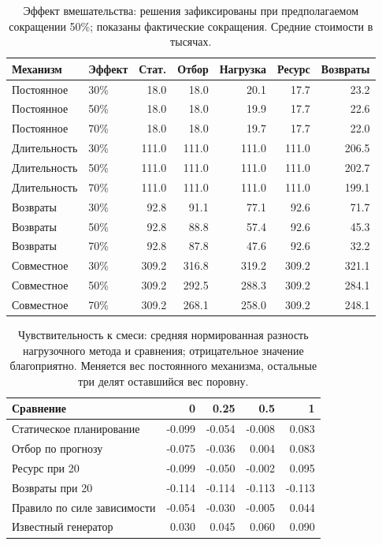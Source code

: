 \begin{table}[p]\caption{Эффект вмешательства: решения зафиксированы при предполагаемом сокращении 50\%; показаны фактические сокращения. Средние стоимости в тысячах.}\centering\small\setlength{\tabcolsep}{3pt}\begin{tabular}{llrrrrr}\toprule
Механизм & Эффект & Стат. & Отбор & Нагрузка & Ресурс & Возвраты\\\midrule
Постоянное & 30\% & 18.0 & 18.0 & 20.1 & 17.7 & 23.2\\
Постоянное & 50\% & 18.0 & 18.0 & 19.9 & 17.7 & 22.6\\
Постоянное & 70\% & 18.0 & 18.0 & 19.7 & 17.7 & 22.0\\
Длительность & 30\% & 111.0 & 111.0 & 111.0 & 111.0 & 206.5\\
Длительность & 50\% & 111.0 & 111.0 & 111.0 & 111.0 & 202.7\\
Длительность & 70\% & 111.0 & 111.0 & 111.0 & 111.0 & 199.1\\
Возвраты & 30\% & 92.8 & 91.1 & 77.1 & 92.6 & 71.7\\
Возвраты & 50\% & 92.8 & 88.8 & 57.4 & 92.6 & 45.3\\
Возвраты & 70\% & 92.8 & 87.8 & 47.6 & 92.6 & 32.2\\
Совместное & 30\% & 309.2 & 316.8 & 319.2 & 309.2 & 321.1\\
Совместное & 50\% & 309.2 & 292.5 & 288.3 & 309.2 & 284.1\\
Совместное & 70\% & 309.2 & 268.1 & 258.0 & 309.2 & 248.1\\
\bottomrule\end{tabular}\end{table}
\begin{table}[p]\caption{Чувствительность к смеси: средняя нормированная разность нагрузочного метода и сравнения; отрицательное значение благоприятно. Меняется вес постоянного механизма, остальные три делят оставшийся вес поровну.}\centering\small\setlength{\tabcolsep}{3pt}\begin{tabular}{p{}rrrr}\toprule
Сравнение & 0 & 0.25 & 0.5 & 1\\\midrule
Статическое планирование & -0.099 & -0.054 & -0.008 & 0.083\\
Отбор по прогнозу & -0.075 & -0.036 & 0.004 & 0.083\\
Ресурс при 20 & -0.099 & -0.050 & -0.002 & 0.095\\
Возвраты при 20 & -0.114 & -0.114 & -0.113 & -0.113\\
Правило по силе зависимости & -0.054 & -0.030 & -0.005 & 0.044\\
Известный генератор & 0.030 & 0.045 & 0.060 & 0.090\\
\bottomrule\end{tabular}\end{table}
